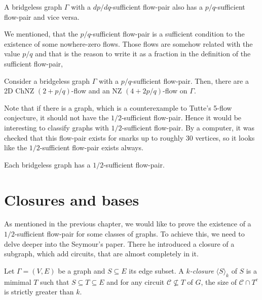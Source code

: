 \begin{lemma}
A bridgeless graph $\Gamma$ with a $dp/dq$-sufficient flow-pair also has a $p/q$-sufficient flow-pair and vice versa.
\end{lemma}

We mentioned, that the $p/q$-sufficient flow-pair is a sufficient condition to the existence of some nowhere-zero flows. Those flows are somehow related with the value $p/q$ and that is the reason to write it as a fraction in the definition of the sufficient flow-pair,

\begin{proposition} \emph{\cite[p. 344]{svk}}
    Consider a bridgeless graph $\Gamma$ with a $p/q$-sufficient flow-pair. Then, there are a 2D ChNZ $(2+p/q)$-flow and an NZ $(4+2p/q)$-flow on $\Gamma$.\label{prop:nzf_from_sufficient_flow_pair}
\end{proposition}

Note that if there is a graph, which is a counterexample to Tutte's 5-flow conjecture, it should not have the $1/2$-sufficient flow-pair. Hence it would be interesting to classify graphs with $1/2$-sufficient flow-pair. By a computer, it was checked that this flow-pair exists for snarks up to roughly $30$ vertices, so it looks like the $1/2$-sufficient flow-pair exists always.

\begin{conjecture} \emph{\cite[p. 346]{svk}}
    Each bridgeless graph has a $1/2$-sufficient flow-pair.
\end{conjecture}


\section{Closures and bases}

As mentioned in the previous chapter, we would like to prove the existence of a $1/2$-sufficient flow-pair for some classes of graphs. To achieve this, we need to delve deeper into the Seymour's paper. There he introduced a closure of a subgraph, which add circuits, that are almost completely in it.

\begin{definition} \cite[p. 132]{seymour}
	Let $\Gamma=(V,E)$ be a graph and $S\subseteq E$ its edge subset. A \emph{$k$-closure} $\langle S\rangle_{k}$ of $S$ is a mimimal $T$ such that $S\subseteq T\subseteq E$ and for any circuit $\mathcal C\not\subseteq T$ of $G$, the size of $\mathcal C\cap T^c$ is strictly greater than $k$.
\end{definition}

